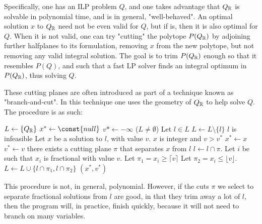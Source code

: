 Specifically, one has an ILP problem $Q$, and one takes advantage that $Q_{\mathbb{R}}$ is solvable in polynomial time, and is in general, "well-behaved". An optimal solution $x$ to $Q_{\mathbb{R}}$ need not be even valid for $Q$, but if is, then it is also optimal for $Q$. When it is not valid, one can try "cutting" the polytope $P(Q_{\mathbb{R}})$ by adjoining further halfplanes to its formulation, removing $x$ from the new polytope, but not removing any valid integral solution. The goal is to trim $P(Q_{\mathbb{R}})$ enough so that it resembles $P(Q)$, and such that a fast LP solver finds an integral optimum in $P(Q_{\mathbb{R}})$, thus solving $Q$.

These cutting planes are often introduced as part of a technique known as "branch-and-cut". In this technique one uses the geometry of $Q_{\mathbb{R}}$ to help solve $Q$. The procedure is as such:

\begin{codebox}
\li $L \gets \{Q_{\mathbb{R}}\}$
\li $x^* \gets \const{null}$
\li $v* \gets -\infty$
\li \While ($L \ne \emptyset$)
 \Do
\li    Let $l \in L$
\li    $L \gets L \setminus \{l\}$
\li    \If $l$ is infeasible
    \Do
\li      {}
    \End
\li    Let $x$ be a solution to $l$, with value $v$.
\li    \If $x$ is integer and $v > v^*$
    \Do
\li      $x^* \gets x$
\li      $v^* \gets v$
\li      {}
    \End
\li    \If there exists a cutting plane $\pi$ that separates $x$ from $l$
    \Do
\li      $l \gets l \cap \pi$.
\li      {}
    \End
\li    Let $i$ be such that $x_i$ is fractional with value $v$.
\li    Let $\pi_1 = x_i \ge \lceil v \rceil$
\li    Let $\pi_2 = x_i \le \lfloor v \rfloor$.
\li    $L \gets L \cup \{l \cap \pi_1, l \cap \pi_2\}$
    \End
\li \Return $(x^*, v^*)$
\end{codebox}

This procedure is not, in general, polynomial. However, if the cuts $\pi$ we select to separate fractional solutions from $l$ are good, in that they trim away a lot of $l$, then the program will, in practice, finish quickly, because it will not need to branch on many variables.
